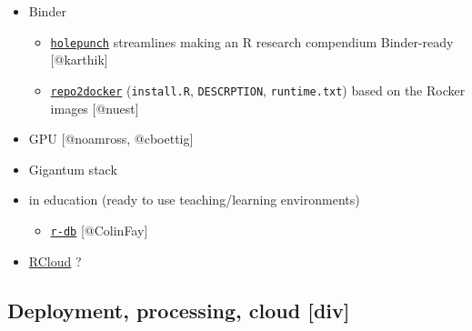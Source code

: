 \begin{itemize}
\tightlist
\item
  Binder

  \begin{itemize}
  \tightlist
  \item
    \href{https://github.com/karthik/holepunch}{\texttt{holepunch}}
    streamlines making an R research compendium Binder-ready
    {[}@karthik{]}
  \item
    \href{https://repo2docker.readthedocs.io/en/latest/config_files.html}{\texttt{repo2docker}}
    (\texttt{install.R}, \texttt{DESCRPTION}, \texttt{runtime.txt})
    based on the Rocker images {[}@nuest{]}
  \end{itemize}
\item
  GPU {[}@noamross, @cboettig{]}
\item
  Gigantum stack
\item
  in education (ready to use teaching/learning environments)

  \begin{itemize}
  \tightlist
  \item
    \href{https://github.com/ColinFay/r-db}{\texttt{r-db}}
    {[}@ColinFay{]}
  \end{itemize}
\item
  \href{https://github.com/att/rcloud/tree/master/docker}{RCloud} ?
\end{itemize}

\hypertarget{deployment-processing-cloud-div}{%
\subsection{Deployment, processing, cloud
{[}div{]}}\label{deployment-processing-cloud-div}}

